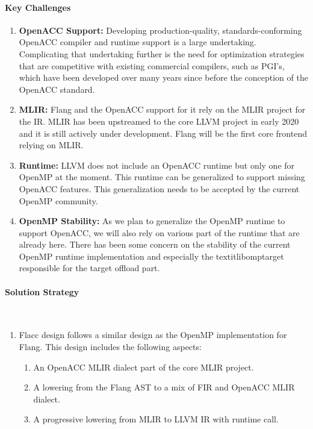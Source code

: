 \paragraph{Key Challenges}

\begin{enumerate}

\item \textbf{OpenACC Support:} Developing production-quality,
      standards-conforming OpenACC compiler and runtime support is a large
      undertaking. Complicating that undertaking further is the need for
      optimization strategies that are competitive with existing commercial
      compilers, such as PGI's, which have been developed over many years
      since before the conception of the OpenACC standard.

\item \textbf{MLIR:} Flang and the OpenACC support for it rely on the MLIR
      project for the IR. MLIR has been upstreamed to
      the core LLVM project in early 2020 and it is still actively under
      development. Flang will be the first core frontend relying on MLIR.

\item \textbf{Runtime:} LLVM does not include an OpenACC runtime but only one
      for OpenMP at the moment. This runtime can be generalized to support
      missing OpenACC features. This generalization needs to be accepted by the
      current OpenMP community.

\item \textbf{OpenMP Stability:} As we plan to generalize the OpenMP runtime to
      support OpenACC, we will also rely on various part of the runtime that
      are already here. There has been some concern on the stability of the
      current OpenMP runtime implementation and especially the
      textit{libomptarget} responsible for the target offload part.

\end{enumerate}

\paragraph{Solution Strategy}

~
\vspace{-1em}

\begin{enumerate}

\item Flacc design follows a similar design as the OpenMP implementation for
      Flang. This design includes the following aspects:

\begin{enumerate}
\item An OpenACC MLIR dialect part of the core MLIR project.
\item A lowering from the Flang AST to a mix of FIR and OpenACC MLIR dialect.
\item A progressive lowering from MLIR to LLVM IR with runtime call.
\end{enumerate}

\end{enumerate}

